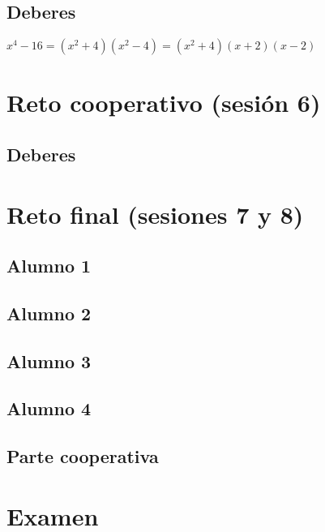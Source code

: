 \subsection{Deberes}
\label{ses4:deberes}

$x^4-16 = (x^2+4)(x^2-4) = (x^2+4)(x+2)(x-2)$

\section{Reto cooperativo (sesión 6)}
\label{ses6:coop}

\subsection{Deberes}
\label{ses6:deberes}



\section{Reto final (sesiones 7 y 8)}
\label{ses7:indiv}

\subsection{Alumno 1}


\subsection{Alumno 2}


\subsection{Alumno 3}


\subsection{Alumno 4}



\subsection{Parte cooperativa}
\label{ses7:coop}


\section{Examen}
\label{examen}